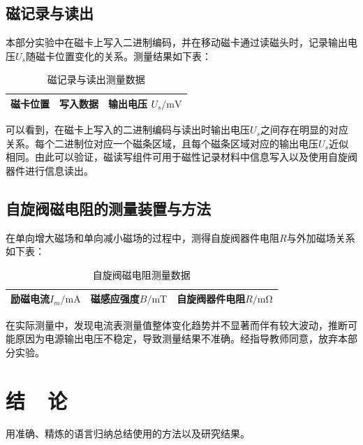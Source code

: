 \documentclass{thuemp}
\begin{document}
\subsection{磁记录与读出}

本部分实验中在磁卡上写入二进制编码，并在移动磁卡通过读磁头时，记录输出电压$U_s$随磁卡位置变化的关系。测量结果如下表：

\begin{table}[H]
    \centering
    \captionnamefont{\wuhao\bf\heiti}
    \captiontitlefont{\wuhao\bf\heiti}
    \caption{磁记录与读出测量数据} \label{tab:magnetic_record}
    \liuhao
    \begin{tabular}{|c|c|c|}
        \toprule
        磁卡位置 & 写入数据& 输出电压 $U_s/\mathrm{mV}$ \\ \hline
        \midrule
        \bottomrule
    \end{tabular}
\end{table}

可以看到，在磁卡上写入的二进制编码与读出时输出电压$U_s$之间存在明显的对应关系。每个二进制位对应一个磁条区域，且每个磁条区域对应的输出电压$U_s$近似相同。由此可以验证，磁读写组件可用于磁性记录材料中信息写入以及使用自旋阀器件进行信息读出。

\subsection{自旋阀磁电阻的测量装置与方法}
在单向增大磁场和单向减小磁场的过程中，测得自旋阀器件电阻$R$与外加磁场关系如下表：
\begin{table}[H]
    \centering
    \captionnamefont{\wuhao\bf\heiti}
    \captiontitlefont{\wuhao\bf\heiti}
    \caption{自旋阀磁电阻测量数据} \label{tab:spin_valve}
    \liuhao
    \begin{tabular}{|c|c|c|}
        \toprule
        励磁电流$I_m/\mathrm{mA}$ & 磁感应强度$B/\mathrm{mT}$ & 自旋阀器件电阻$R/\mathrm{m\Omega}$ \\ \hline
        \midrule
        \bottomrule
    \end{tabular}
\end{table}

在实际测量中，发现电流表测量值整体变化趋势并不显著而伴有较大波动，推断可能原因为电源输出电压不稳定，导致测量结果不准确。经指导教师同意，放弃本部分实验。

\section{结~~论}
用准确、精炼的语言归纳总结使用的方法以及研究结果。
\end{document}
